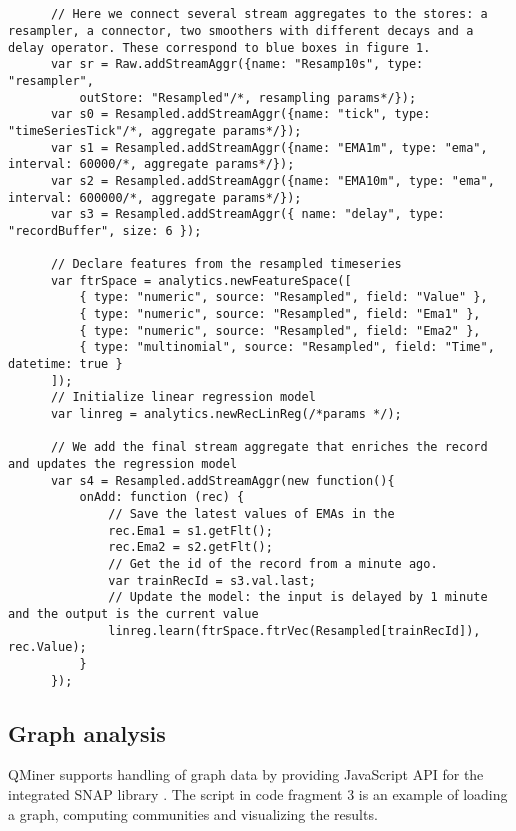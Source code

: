 \documentclass{article} %
\begin{document}
      \begin{lstlisting}[caption=Time series processing] 	
      
      
      // Here we connect several stream aggregates to the stores: a resampler, a connector, two smoothers with different decays and a delay operator. These correspond to blue boxes in figure 1.
      var sr = Raw.addStreamAggr({name: "Resamp10s", type: "resampler",
          outStore: "Resampled"/*, resampling params*/});
      var s0 = Resampled.addStreamAggr({name: "tick", type: "timeSeriesTick"/*, aggregate params*/});
      var s1 = Resampled.addStreamAggr({name: "EMA1m", type: "ema", interval: 60000/*, aggregate params*/});
      var s2 = Resampled.addStreamAggr({name: "EMA10m", type: "ema", interval: 600000/*, aggregate params*/});
      var s3 = Resampled.addStreamAggr({ name: "delay", type: "recordBuffer", size: 6 });

      // Declare features from the resampled timeseries
      var ftrSpace = analytics.newFeatureSpace([
          { type: "numeric", source: "Resampled", field: "Value" },
          { type: "numeric", source: "Resampled", field: "Ema1" },
          { type: "numeric", source: "Resampled", field: "Ema2" },
          { type: "multinomial", source: "Resampled", field: "Time", datetime: true }
      ]);
      // Initialize linear regression model
      var linreg = analytics.newRecLinReg(/*params */);
      
      // We add the final stream aggregate that enriches the record and updates the regression model
      var s4 = Resampled.addStreamAggr(new function(){
          onAdd: function (rec) {
              // Save the latest values of EMAs in the
              rec.Ema1 = s1.getFlt();
              rec.Ema2 = s2.getFlt();
              // Get the id of the record from a minute ago.
              var trainRecId = s3.val.last;
              // Update the model: the input is delayed by 1 minute and the output is the current value
              linreg.learn(ftrSpace.ftrVec(Resampled[trainRecId]), rec.Value);
          }
      });
      \end{lstlisting}


\subsection{Graph analysis}
QMiner supports handling of graph data by providing JavaScript API for the integrated SNAP library \cite{snap}.
The script in code fragment 3 is an example of loading a graph, computing communities and visualizing the results.
\end{document}
